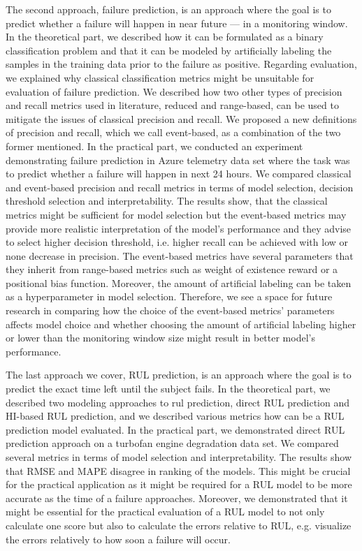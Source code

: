 \begin{conclusion}
The second approach, failure prediction, is an approach where the goal is to predict whether a failure will happen in near future --- in a monitoring window.
In the theoretical part, we described how it can be formulated as a binary classification problem and that it can be modeled by artificially labeling the samples in the training data prior to the failure as positive.
Regarding evaluation, we explained why classical classification metrics might be unsuitable for evaluation of failure prediction.
We described how two other types of precision and recall metrics used in literature, reduced and range-based, can be used to mitigate the issues of classical precision and recall.
We proposed a new definitions of precision and recall, which we call event-based, as a combination of the two former mentioned.
In the practical part, we conducted an experiment demonstrating failure prediction in Azure telemetry data set where the task was to predict whether a failure will happen in next 24 hours.
We compared classical and event-based precision and recall metrics in terms of model selection, decision threshold selection and interpretability.
The results show, that the classical metrics might be sufficient for model selection but the event-based metrics may provide more realistic interpretation of the model's performance and they advise to select higher decision threshold, i.e. higher recall can be achieved with low or none decrease in precision.
The event-based metrics have several parameters that they inherit from range-based metrics such as weight of existence reward or a positional bias function.
Moreover, the amount of artificial labeling can be taken as a hyperparameter in model selection.
Therefore, we see a space for future research in comparing how the choice of the event-based metrics' parameters affects model choice and whether choosing the amount of artificial labeling higher or lower than the monitoring window size might result in better model's performance.

The last approach we cover, RUL prediction, is an approach where the goal is to predict the exact time left until the subject fails.
In the theoretical part, we described two modeling approaches to \acrshort{rul} prediction, direct RUL prediction and HI-based RUL prediction, and we described various metrics how can be a RUL prediction model evaluated.
In the practical part, we demonstrated direct RUL prediction approach on a turbofan engine degradation data set.
We compared several metrics in terms of model selection and interpretability.
The results show that RMSE and MAPE disagree in ranking of the models.
This might be crucial for the practical application as it might be required for a RUL model to be more accurate as the time of a failure approaches.
Moreover, we demonstrated that it might be essential for the practical evaluation of a RUL model to not only calculate one score but also to calculate the errors relative to RUL, e.g. visualize the errors relatively to how soon a failure will occur.


\end{conclusion}
